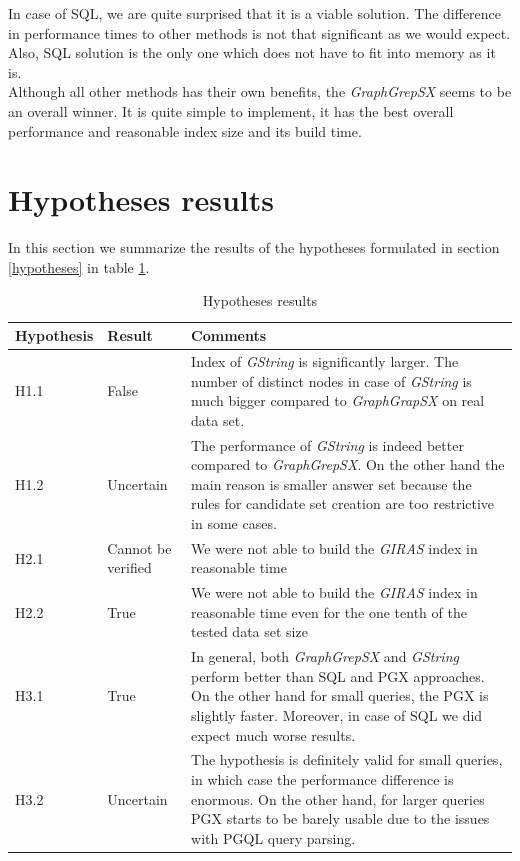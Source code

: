 In case of SQL, we are quite surprised that it is a viable solution. The difference in performance times to other methods is not that significant as we would expect. Also, SQL solution is the only one which does not have to fit into memory as it is.\\

Although all other methods has their own benefits, the \textit{GraphGrepSX} seems to be an overall winner. It is quite simple to implement, it has the best overall performance and reasonable index size and its build time.

\section{Hypotheses results}
In this section we summarize the results of the hypotheses formulated in section \ref{hypotheses} in table \ref{hypothesisresults}.

\begin{table}[h]
	\centering
	\renewcommand{\arraystretch}{2.5}
	\setlength{\arrayrulewidth}{0.5mm
	}
	\begin{tabular}[h!]{|p{2cm}|p{2cm}|p{9cm}|}
		\hline
		\rowcolor{lightgray}
		Hypothesis & Result & Comments\\ \hline
		H1.1 & False & Index of \textit{GString} is significantly larger. The number of distinct nodes in case of \textit{GString} is much bigger compared to \textit{GraphGrapSX} on real data set.\\ \hline
		H1.2 & Uncertain & The performance of \textit{GString} is indeed better compared to \textit{GraphGrepSX}. On the other hand the main reason is smaller answer set because the rules for candidate set creation are too restrictive in some cases.\\ \hline
		H2.1 & Cannot be verified & We were not able to build the \textit{GIRAS} index in reasonable time\\ \hline
		H2.2 & True & We were not able to build the \textit{GIRAS} index in reasonable time even for the one tenth of the tested data set size\\ \hline
		H3.1 & True & In general, both \textit{GraphGrepSX} and \textit{GString} perform better than SQL and PGX approaches. On the other hand for small queries, the PGX is slightly faster. Moreover, in case of SQL we did expect much worse results.\\ \hline
		H3.2 & Uncertain & The hypothesis is definitely valid for small queries, in which case the performance difference is enormous. On the other hand, for larger queries PGX starts to be barely usable due to the issues with PGQL query parsing.\\ \hline
	\end{tabular}
	\caption{Hypotheses results}
	\label{hypothesisresults}
\end{table}